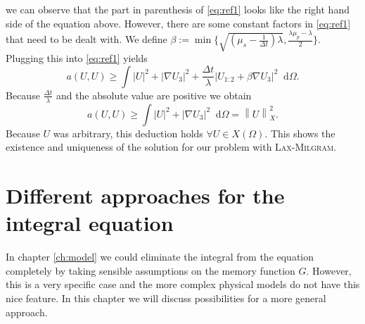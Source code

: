\documentclass[12pt,a4paper,twoside, open=right]{scrreprt}
\theoremstyle{definition}
\theoremstyle{plain}
\newcommand{\abs}[1]{\left\vert #1\right\vert}
\newcommand{\norm}[1]{\left\lVert#1\right\rVert}
\newcommand{\D}{\mathop{}\!\mathrm{d}}
\begin{document}
we can observe that the part in parenthesis of \eqref{eq:ref1} looks like the right hand side of the equation above. However, there are some constant factors in \eqref{eq:ref1} that need to be dealt with. We define $\beta:=\min\{\sqrt{(\mu_s-\frac{1}{\Delta t})\lambda},\frac{\lambda\mu_p-\lambda}{2}\}$. Plugging this into \eqref{eq:ref1} yields
\begin{equation}
    a(U,U)\ge \int\abs{U}^2+\abs{\nabla U_3}^2+\frac{\Delta t}{\lambda}\abs{U_{1:2}+\beta\nabla U_3}^2\D\Omega.
\end{equation}
Because $\frac{\Delta t}{\lambda}$ and the absolute value are positive we obtain
\begin{equation}
    a(U,U)\ge\int\abs{U}^2+\abs{\nabla U_3}^2\D\Omega =\norm{U}_{X}^2.
\end{equation}
Because $U$ was arbitrary, this deduction holds $\forall U\in X(\Omega)$. This shows the existence and uniqueness of the solution for our problem with \textsc{Lax-Milgram}.
\chapter{Different approaches for the integral equation}
In chapter \ref{ch:model} we could eliminate the integral from the equation completely by taking sensible assumptions on the memory function $G$. However, this is a very specific case and the more complex physical models do not have this nice feature. In this chapter we will discuss possibilities for a more general approach. 
\end{document}

